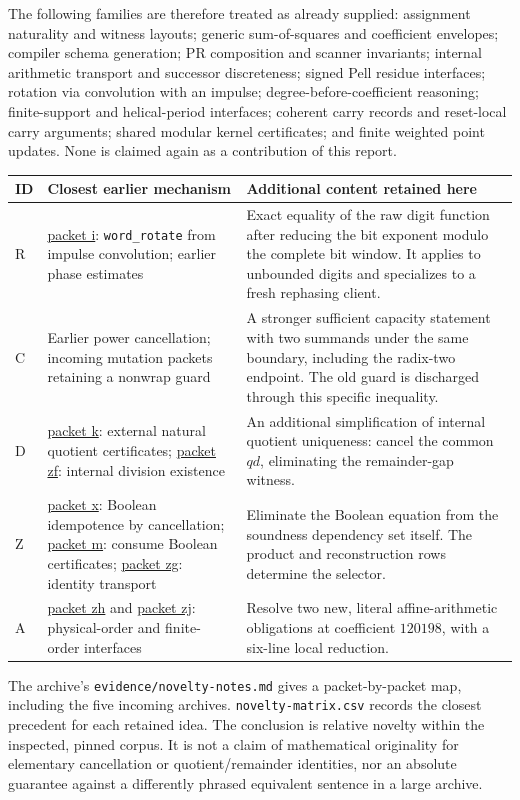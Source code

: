 \documentclass[11pt,letterpaper]{article}
\newcommand{\code}[1]{\nolinkurl{#1}}
\newcommand{\packet}[1]{\href{https://github.com/VladimirReshetnikov/ProveIt/tree/9d9d1123b39927d30363f1dcd53c23f0575c30ee/Computability/DiophantineConsistency/research/lean-proof-simplification/2026-10-26#1}{packet #1}}
\begin{document}
The following families are therefore treated as already supplied: assignment naturality and witness layouts; generic sum-of-squares and coefficient envelopes; compiler schema generation; PR composition and scanner invariants; internal arithmetic transport and successor discreteness; signed Pell residue interfaces; rotation via convolution with an impulse; degree-before-coefficient reasoning; finite-support and helical-period interfaces; coherent carry records and reset-local carry arguments; shared modular kernel certificates; and finite weighted point updates. None is claimed again as a contribution of this report.

\begin{longtable}{@{}p{.09\linewidth}p{.37\linewidth}p{.47\linewidth}@{}}
\toprule ID & Closest earlier mechanism & Additional content retained here\\\midrule\endhead
R & \packet{i}: \code{word_rotate} from impulse convolution; earlier phase estimates & Exact equality of the raw digit function after reducing the bit exponent modulo the complete bit window. It applies to unbounded digits and specializes to a fresh rephasing client.\\
C & Earlier power cancellation; incoming mutation packets retaining a nonwrap guard & A stronger sufficient capacity statement with two summands under the same boundary, including the radix-two endpoint. The old guard is discharged through this specific inequality.\\
D & \packet{k}: external natural quotient certificates; \packet{zf}: internal division existence & An additional simplification of internal quotient uniqueness: cancel the common $qd$, eliminating the remainder-gap witness.\\
Z & \packet{x}: Boolean idempotence by cancellation; \packet{m}: consume Boolean certificates; \packet{zg}: identity transport & Eliminate the Boolean equation from the soundness dependency set itself. The product and reconstruction rows determine the selector.\\
A & \packet{zh} and \packet{zj}: physical-order and finite-order interfaces & Resolve two new, literal affine-arithmetic obligations at coefficient $120198$, with a six-line local reduction.\\
\bottomrule
\end{longtable}

The archive's \code{evidence/novelty-notes.md} gives a packet-by-packet map, including the five incoming archives. \code{novelty-matrix.csv} records the closest precedent for each retained idea. The conclusion is relative novelty within the inspected, pinned corpus. It is not a claim of mathematical originality for elementary cancellation or quotient/remainder identities, nor an absolute guarantee against a differently phrased equivalent sentence in a large archive.
\end{document}
